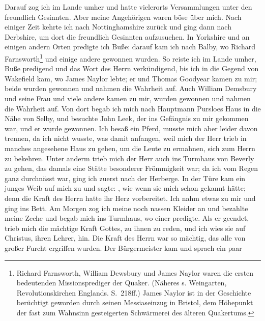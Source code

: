 Darauf zog ich im Lande umher und hatte vielerorts 
Versammlungen unter den freundlich Gesinnten. Aber meine 
Angehörigen waren böse über mich. 
Nach einiger Zeit kehrte ich nach
Nottinghamshire zurück und ging 
dann nach Derbshire, um dort
die freundlich Gesinnten aufzusuchen. In 
Yorkshire und an einigen
andern Orten predigte ich Buße: darauf kam ich nach Balby,
wo Richard 
Farnsworth\footnote{Richard 
Farnsworth, William Dewsbury und James Naylor waren
die ersten bedeutenden Missionsprediger der Quaker. 
(Näheres s. Weingarten, Revolutionskirchen 
Englands. S.~218ff.) James Naylor ist in der Geschichte
berüchtigt geworden durch seinen Messiaseinzug in Bristol, 
dem Höhepunkt der fast zum Wahnsinn gesteigerten 
Schwärmerei des älteren Quakertums.} und einige 
andere gewonnen wurden.
So reiste ich im Lande umher, Buße 
predigend und das Wort
des Herrn verkündigend, bis ich in die Gegend von 
Wakefield
kam, wo James Naylor lebte; 
er und Thomas Goodyear
kamen zu mir; beide wurden gewonnen und nahmen die Wahrheit
auf. Auch William Demsbury 
und seine Frau und viele andere
kamen zu mir, wurden gewonnen und nahmen die Wahrheit auf.
Von dort begab ich mich nach Hauptmann 
Pursloes Haus in
die Nähe von Selby, und besuchte John 
Leek, der ins Gefängnis
zu mir gekommen war, und er wurde gewonnen. Ich besaß ein
Pferd, musste mich aber leider davon trennen, da ich nicht wusste,
was damit anfangen, weil mich der Herr trieb in manches 
angesehene Haus zu gehen, um die Leute zu ermahnen, sich zum
Herrn zu bekehren. Unter anderm trieb mich der Herr auch ins
Turmhaus von Beverly zu gehen, das damals 
eine Stätte besonderer Frömmigkeit war; da ich vom 
Regen ganz durchnässt war,
ging ich zuerst nach der Herberge. In der Türe kam ein junges
Weib auf mich zu und sagte: ,
wie wenn sie mich schon gekannt hätte; denn die Kraft des Herrn
hatte ihr Herz vorbereitet. Ich nahm etwas zu mir und ging
ins Bett. Am Morgen zog ich meine noch nassen Kleider an
und bezahlte meine Zeche und begab mich ins Turmhaus, wo
einer predigte. Als er geendet, trieb mich die mächtige Kraft Gottes,
zu ihnen zu reden, und ich wies sie auf Christus, ihren Lehrer, hin.
Die Kraft des Herrn war so mächtig, das alle von großer Furcht
ergriffen wurden. Der Bürgermeister kam und sprach ein paar
